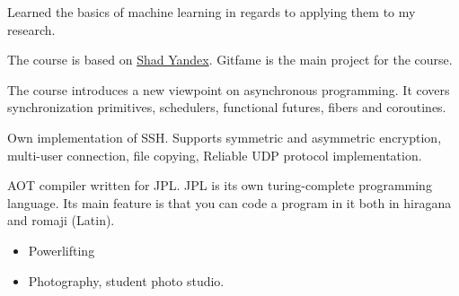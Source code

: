 
Learned the basics of machine learning in regards to applying them to my research.
\medskip

The course is based on \href{https://shad.yandex.ru}{Shad Yandex}. Gitfame is the main project for the course.
\medskip

The course introduces a new viewpoint on asynchronous programming.
It covers synchronization primitives, schedulers, functional futures, fibers and coroutines.
\medskip

Own implementation of SSH. Supports symmetric and asymmetric encryption, multi-user connection, file copying, Reliable UDP protocol implementation.
\medskip

AOT compiler written for JPL. JPL is its own turing-complete programming language.
Its main feature is that you can code a program in it both in hiragana and romaji (Latin).

\divider

\begin{itemize}
    \item Powerlifting
    \item Photography, student photo studio.
\end{itemize}

